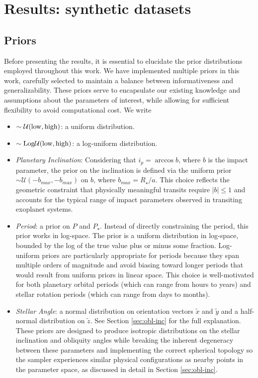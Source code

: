 \documentclass[twocolumn]{aastex631}
\begin{document}
\section{Results: synthetic datasets}
\label{sec:results-synthetic}
\subsection{Priors}
Before presenting the results, it is essential to elucidate the prior
distributions employed throughout this work. We have implemented multiple priors
in this work, carefully selected to maintain a balance between informativeness
and generalizability. These priors serve to encapsulate our existing knowledge
and assumptions about the parameters of interest, while allowing for sufficient
flexibility to avoid computational cost.  We write
\begin{itemize}
    \item $\sim\mathcal{U}(\rm low, \rm high)$: a uniform distribution.
    \item $\sim \rm Log \mathcal{U}(\rm low, \rm high)$: a log-uniform distribution.
    \item \textit{Planetary Inclination}: Considering that $i_p=\arccos{b}$,
    where $b$ is the impact parameter, the prior on the inclination is defined
    via the uniform prior $\sim\mathcal{U}(-b_{max}, -b_{max})$ on $b$, where
    $b_{max} = R_{\star} / a$. This choice reflects the geometric constraint that physically meaningful transits 
    require $|b| \leq 1$ and accounts for the typical range of impact parameters observed in transiting exoplanet systems.
    \item \textit{Period}: a prior on $P$ and $P_{\star}$. Instead of directly
    constraining the period, this prior works in log-space. The prior is a uniform distribution in
    log-space, bounded by the log of the true value plus or minus some fraction. Log-uniform priors are particularly 
    appropriate for periods because they span multiple orders of magnitude and avoid biasing toward longer periods that 
    would result from uniform priors in linear space. This choice is well-motivated for both planetary orbital periods (which can range 
    from hours to years) and stellar rotation periods (which can range from days to months).
    \item \textit{Stellar Angle}: a normal distribution on orientation vectors $\tilde{x}$ and $\tilde{y}$ and a half-normal distribution 
    on $\tilde{z}$. See Section
    \ref{sec:obl-inc} for the full explanation. These priors are designed to produce isotropic distributions on the stellar 
    inclination and obliquity angles while breaking the inherent degeneracy between these parameters and implementing the correct spherical topology so the sampler experiences similar physical configurations as nearby points in the parameter space, as discussed in detail in Section \ref{sec:obl-inc}.
\end{itemize}
\end{document}
